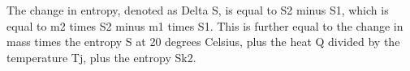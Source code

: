 The change in entropy, denoted as Delta S, is equal to S2 minus S1, which is equal to m2 times S2 minus m1 times S1. This is further equal to the change in mass times the entropy S at 20 degrees Celsius, plus the heat Q divided by the temperature Tj, plus the entropy Sk2.